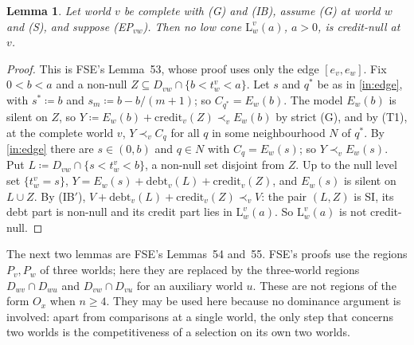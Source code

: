 \documentclass[11pt]{article}
\newtheorem{lemma}[theorem]{Lemma}
\theoremstyle{definition}\newtheorem{definition}[theorem]{Definition}
\theoremstyle{remark}\newtheorem{remark}[theorem]{Remark}
\newcommand{\debt}{\mathrm{debt}}
\newcommand{\cred}{\mathrm{credit}}
\newcommand{\Lo}[3]{\mathrm L^{#1}_{#2}(#3)}
\begin{document}
\begin{lemma}\label{lem:EPnotCN}
Let world $v$ be complete with (G) and (IB), assume (G) at world $w$ and
(S), and suppose (EP$_{vw}$). Then no low cone $\Lo vwa$, $a>0$, is
credit-null at~$v$.
\end{lemma}
\begin{proof}
This is FSE's Lemma~53, whose proof uses only the edge $[e_v,e_w]$. Fix
$0<b<a$ and a non-null $Z\subseteq D_{vw}\cap\{b<t^v_w<a\}$. Let $s$ and
$q^*$ be as in \ref{in:edge}, with $s^*\coloneqq b$ and
$s_m\coloneqq b-b/(m+1)$; so $C_{q^*}=E_w(b)$. The model $E_w(b)$ is
silent on $Z$, so $Y\coloneqq E_w(b)+\cred_v(Z)\prec_vE_w(b)$ by strict (G),
and by (T1), at the complete world $v$, $Y\prec_vC_q$ for all $q$ in some
neighbourhood $N$ of $q^*$. By \ref{in:edge} there are $s\in(0,b)$ and
$q\in N$ with $C_q=E_w(s)$; so $Y\prec_vE_w(s)$. Put
$L\coloneqq D_{vw}\cap\{s<t^v_w<b\}$, a non-null set disjoint from $Z$. Up to
the null level set $\{t^v_w=s\}$, $Y=E_w(s)+\debt_v(L)+\cred_v(Z)$, and
$E_w(s)$ is silent on $L\cup Z$. By (IB$'$),
$V+\debt_v(L)+\cred_v(Z)\prec_vV$: the pair $(L,Z)$ is SI, its debt part
is non-null and its credit part lies in $\Lo vwa$. So $\Lo vwa$ is not
credit-null.
\end{proof}

The next two lemmas are FSE's Lemmas~54 and~55. FSE's proofs use the
regions $P_v,P_w$ of three worlds; here they are replaced by the
three-world regions $D_{wv}\cap D_{wu}$ and $D_{vw}\cap D_{vu}$ for an
auxiliary world $u$. These are not regions of the form $O_x$ when $n\ge4$.
They may be used here because no dominance argument is involved: apart
from comparisons at a single world, the only step that concerns two
worlds is the competitiveness of a selection on its own two worlds.
\end{document}

